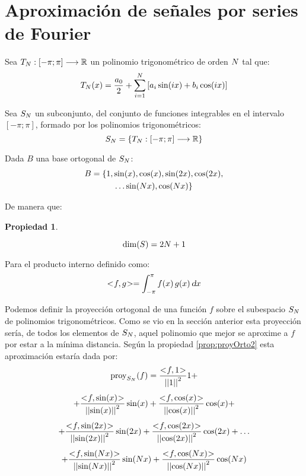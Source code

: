 \documentclass[a5paper,12pt,twoside]{book}
\newtheorem{prop}{{Propiedad}}[chapter]
\begin{document}
\section{Aproximación de señales por series de Fourier}

Sea $T_N: \left[-\pi;\pi\right] \longrightarrow \mathbb{R}$ un polinomio trigonométrico de orden $N$ tal que:
\begin{equation*}
    T_N(x) = \frac{a_0}{2} + \sum_{i=1}^N \left[ a_i \sin(i x) + b_i \cos(i x) \right]
\end{equation*}

Sea $S_N$ un subconjunto, del conjunto de funciones integrables en el intervalo $[-\pi;\pi]$, formado por los polinomios trigonométricos:
\begin{equation*}
    S_N = { \left\{ {T_N: \left[-\pi;\pi\right] \longrightarrow \mathbb{R}} \right\} }
\end{equation*}

Dada $B$ una base ortogonal de $S_N$:
\begin{multline*}
    B = \{ 1 , \sin(x) , \cos(x) , \sin(2x) , \cos(2x) ,
    \\
    \dots \sin(N x) , \cos(N x) \}
\end{multline*}

De manera que:

\begin{mdframed}[style=MyFrame1]
    \begin{prop}
    \end{prop}
    \begin{equation*}
        \operatorname{dim}(S) = 2 N + 1
    \end{equation*}
\end{mdframed}

Para el producto interno definido como:
\begin{equation*}
    <\hspace{-0.8mm}f,g\hspace{-0.8mm}> = \int_{-\pi}^\pi f(x) \, g(x) \, \textsl{d} x
\end{equation*}

Podemos definir la proyección ortogonal de una función $f$ sobre el subespacio $S_N$ de polinomios trigonométricos. Como se vio en la sección anterior esta proyección sería, de todos los elementos de $S_N$, aquel polinomio que mejor se aproxime a $f$ por estar a la mínima distancia. Según la propiedad \ref{prop:proyOrto2} esta aproximación estaría dada por:
\begin{multline*}
    \proy_{S_\Nth}(f) = \frac{\intProd{f}{1}}{\nnorm{1}^2} 1 +
    \\[1ex]
    + \frac{\intProd{f}{\sin(x)}}{\nnorm{\sin(x)}^2} \sin(x) + \frac{\intProd{f}{\cos(x)}}{\nnorm{\cos(x)}^2} \cos(x) +
    \\[1ex]
    + \frac{\intProd{f}{\sin(2x)}}{\nnorm{\sin(2x)}^2} \sin(2x) + \frac{\intProd{f}{\cos(2x)}}{\nnorm{\cos(2x)}^2} \cos(2x) + \dots
    \\[1ex]
    + \frac{\intProd{f}{\sin(\Nth x)}}{\nnorm{\sin(\Nth x)}^2} \sin(\Nth x) + \frac{\intProd{f}{\cos(\Nth x)}}{\nnorm{\cos(\Nth x)}^2} \cos(\Nth x)
\end{multline*}
\end{document}
